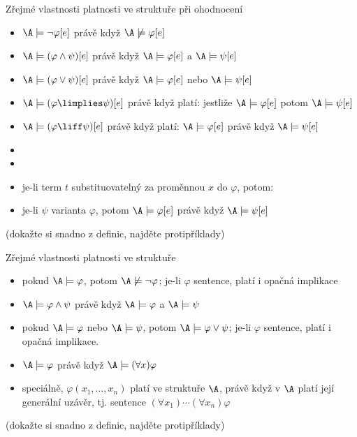 \documentclass{beamer}
\begin{document}
\begin{frame}{Zřejmé vlastnosti platnosti ve struktuře při ohodnocení}

    \begin{itemize}
        \item $\A\models\neg\varphi[e]$ právě když $\A\not\models\varphi[e]$
        \item $\A\models(\varphi\land\psi)[e]$ právě když $\A\models\varphi[e]$ a $\A\models\psi[e]$
        \item $\A\models(\varphi\lor\psi)[e]$ právě když $\A\models\varphi[e]$ nebo $\A\models\psi[e]$
        \item $\A\models(\varphi\limplies\psi)[e]$ právě když platí: jestliže $\A\models\varphi[e]$ potom $\A \models\psi[e]$
        \item $\A\models(\varphi\liff\psi)[e]$ právě když platí: $\A\models\varphi[e]$ právě když $\A\models\psi[e]
        $
        \item {}
        \item {}
        \item je-li term $t$ substituovatelný za proměnnou $x$ do $\varphi$, potom:
        \item je-li $\psi$ varianta $\varphi$, potom $\A\models\varphi[e]$ právě když $\A\models\psi[e]$
    \end{itemize}

    (dokažte si snadno z definic, najděte protipříklady)  

\end{frame}


\begin{frame}{Zřejmé vlastnosti platnosti ve struktuře}

    \begin{itemize}
        \item pokud $\A\models\varphi$, potom $\A\not\models\neg\varphi$; je-li $\varphi$ sentence, platí i opačná implikace
        \item $\A\models\varphi\land\psi$ právě když $\A\models\varphi$ a $\A\models\psi$
        \item pokud $\A\models\varphi$ nebo $\A\models\psi$, potom $\A\models\varphi\lor\psi$; je-li $\varphi$ sentence,  platí i opačná implikace.
        \item $\A\models\varphi$ právě když $\A\models
        (\forall x)\varphi$
        \item speciálně, $\varphi(x_1,\dots,x_n)$ platí ve struktuře $\A$, právě když v $\A$ platí její \alert{generální uzávěr}, tj. sentence $(\forall x_1)\cdots(\forall x_n)\varphi$ 
    \end{itemize}

    (dokažte si snadno z definic, najděte protipříklady)

\end{frame}
\end{document}
